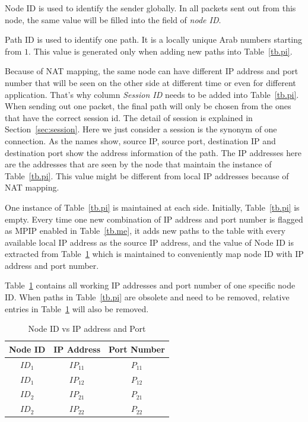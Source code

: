 Node ID is used to identify the sender globally. In all packets sent out from this node, the same value will be filled into the field of \emph{node ID}.

Path ID is used to identify one path. It is a locally unique Arab numbers starting from $1$. This value is generated only when adding new paths into Table~\ref{tb.pi}. 

Because of NAT mapping, the same node can have different IP address and port number that will be seen on the other side at different time or even for different application. That's why column \emph{Session ID} needs to be added into Table~\ref{tb.pi}. When sending out one packet, the final path will only be chosen from the ones that have the correct session id. The detail of session is explained in Section~\ref{sec:session}. Here we just consider a session is the synonym of one connection. As the names show, source IP, source port, destination IP and destination port show the address information of the path. The IP addresses here are the addresses that are seen by the node that maintain the instance of Table~\ref{tb.pi}. This value might be different from local IP addresses because of NAT mapping.

One instance of Table~\ref{tb.pi} is maintained at each side. Initially, Table~\ref{tb.pi} is empty. Every time one new combination of IP address and port number is flagged as MPIP enabled in Table~\ref{tb.me}, it adds new paths to the table with every available local IP address as the source IP address, and the value of Node ID is extracted from Table~\ref{tb.wi} which is maintained to conveniently map node ID with IP address and port number. 

Table~\ref{tb.wi} contains all working IP addresses and port number of one specific node ID. When paths in Table~\ref{tb.pi} are obsolete and need to be removed, relative entries in Table~\ref{tb.wi} will also be removed.

\begin{table}[htbp]
\caption{\label{tb.wi}Node ID vs IP address and Port}
\centering
\begin{tabular}{|c|c|c|}
\hline
 Node ID  & IP Address & Port Number\\
\hline
${ID}_{1}$&${IP}_{11}$&${P}_{11}$ \\
\hline
${ID}_{1}$&${IP}_{12}$&${P}_{12}$ \\
\hline
${ID}_{2}$&${IP}_{21}$&${P}_{21}$ \\
\hline
${ID}_{2}$&${IP}_{22}$&${P}_{22}$ \\
\hline
\end{tabular}
\end{table}

